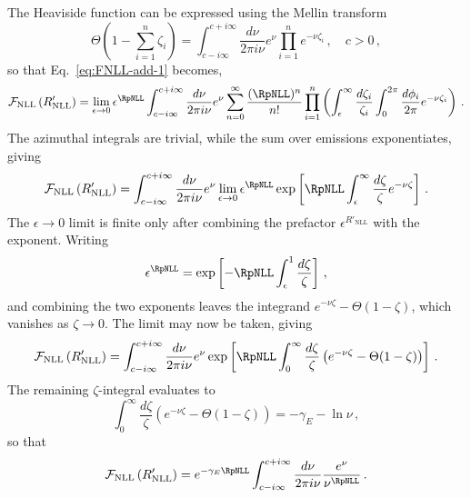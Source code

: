 The Heaviside function can be expressed using the Mellin transform
\begin{equation}
\label{eq:mellin-transform}
    \Theta\left(1-\sum_{i=1}^n\zeta_i\right)=\int_{c-i\infty}^{c+i\infty}
    \frac{d\nu}{2\pi i\nu} e^\nu\prod_{i=1}^ne^{-\nu\zeta_i}\,, \quad c>0\,,
\end{equation}
so that Eq.~\eqref{eq:FNLL-add-1} becomes,
\begin{equation}
\label{eq:FNLL-add-2}
    \mathcal{F}_{\mathrm{NLL}}\left(R'_{\mathrm{NLL}}\right)=\lim_{\epsilon\to 0} \epsilon^{\RpNLL} \int_{c-i\infty}^{c+i\infty}\frac{d\nu}{2\pi i \nu}e^\nu \sum_{n=0}^\infty\frac{(\RpNLL)^n}{n!}  \prod_{i=1}^n \left(\int_{\epsilon}^\infty \frac{d\zeta_i}{\zeta_i} \int_0^{2\pi}\frac{d\phi_i}{2\pi} e^{-\nu\zeta_i}\right) \,.
\end{equation}
The azimuthal integrals are trivial, while the sum over emissions exponentiates, giving
\begin{equation}
\label{eq:FNLL-add-3}
    \mathcal{F}_{\mathrm{NLL}}\left(R'_{\mathrm{NLL}}\right)= \int_{c-i\infty}^{c+i\infty}\frac{d\nu}{2\pi i \nu}e^\nu \lim_{\epsilon\to 0} \epsilon^{\RpNLL} \exp\left[ \RpNLL \int_{\epsilon}^\infty \frac{d\zeta}{\zeta} e^{-\nu\zeta}\right] \,.
\end{equation}
The $\epsilon\to0$ limit is finite only after combining the 
prefactor $\epsilon^{R'_{\mathrm{NLL}}}$ with the exponent.
Writing
\begin{equation}
  \epsilon^{\RpNLL}=\exp\left[-\RpNLL\int_{\epsilon}^1\frac{d\zeta}{\zeta}\right]\,,
  \end{equation}
and combining the two exponents leaves the integrand
$e^{-\nu\zeta}-\Theta(1-\zeta)$, which vanishes as $\zeta\to0$. The
limit may now be taken, giving
\begin{equation}
\label{eq:FNLL-add-4}
    \mathcal{F}_{\mathrm{NLL}}\left(R'_{\mathrm{NLL}}\right)= \int_{c-i\infty}^{c+i\infty}\frac{d\nu}{2\pi i \nu}e^\nu \exp\left[ \RpNLL \int_{0}^\infty \frac{d\zeta}{\zeta} \left(e^{-\nu\zeta} - \Theta(1-\zeta)\right)\right] \,.
\end{equation}
The remaining $\zeta$-integral evaluates to
\begin{equation}
	 \int_{0}^\infty \frac{d\zeta}{\zeta} \left(e^{-\nu\zeta} - \Theta(1-\zeta)\right) = -\gamma_E -\ln\nu\,,
\end{equation}
so that
\begin{equation}
\label{eq:FNLL-add-5}
    \mathcal{F}_{\mathrm{NLL}}\left(R'_{\mathrm{NLL}}\right)= e^{-\gamma_E \RpNLL} \int_{c-i\infty}^{c+i\infty}\frac{d\nu}{2\pi i\nu}\frac{e^\nu}{\nu^{\RpNLL}}\,.
\end{equation}
